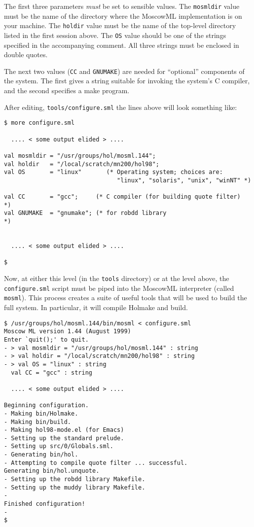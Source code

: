 The first three parameters \emph{must} be set to sensible values.  The
\texttt{mosmldir} value must be the name of the directory where the
MoscowML implementation is on your machine.  The \texttt{holdir} value
must be the name of the top-level directory listed in the first
session above.  The \texttt{OS} value should be one of the strings
specified in the accompanying comment.   All three strings must be
enclosed in double quotes.

The next two values (\texttt{CC} and \texttt{GNUMAKE}) are needed for
``optional'' components of the system.  The first gives a string
suitable for invoking the system's C compiler, and the second
specifies a \textsf{make} program.

After editing, \texttt{tools/configure.sml} the lines above will look
something like:

\begin{session}
\begin{verbatim}
$ more configure.sml

  .... < some output elided > ....

val mosmldir = "/usr/groups/hol/mosml.144";
val holdir   = "/local/scratch/mn200/hol98";
val OS       = "linux"       (* Operating system; choices are:
                                "linux", "solaris", "unix", "winNT" *)

val CC       = "gcc";     (* C compiler (for building quote filter)        *)
val GNUMAKE  = "gnumake"; (* for robdd library                             *)


  .... < some output elided > ....

$
\end{verbatim}
\end{session}

\noindent Now, at either this level (in the \texttt{tools} directory)
or at the level above, the \texttt{configure.sml} script must be piped
into the MoscowML interpreter (called \texttt{mosml}).  This process
creates a suite of useful tools that will be used to build the full
system.  In particular, it will compile \textsf{Holmake} and
\textsf{build}.

\begin{session}
\begin{verbatim}
$ /usr/groups/hol/mosml.144/bin/mosml < configure.sml
Moscow ML version 1.44 (August 1999)
Enter `quit();' to quit.
- > val mosmldir = "/usr/groups/hol/mosml.144" : string
- > val holdir = "/local/scratch/mn200/hol98" : string
- > val OS = "linux" : string
  val CC = "gcc" : string

  .... < some output elided > ....

Beginning configuration.
- Making bin/Holmake.
- Making bin/build.
- Making hol98-mode.el (for Emacs)
- Setting up the standard prelude.
- Setting up src/0/Globals.sml.
- Generating bin/hol.
- Attempting to compile quote filter ... successful.
Generating bin/hol.unquote.
- Setting up the robdd library Makefile.
- Setting up the muddy library Makefile.
-
Finished configuration!
-
$
\end{verbatim}
\end{session}

